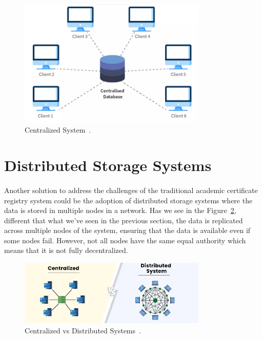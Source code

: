 \begin{figure}[h]\label{fig:centralized-system}
    \begin{center}
        \includegraphics[width=0.8\textwidth]{assets/centralized-database.png}
        \caption{Centralized System~\cite{centralizedDB}.}
    \end{center}
\end{figure}

\section{Distributed Storage Systems}\label{sec:distributed-systems}
\paragraph{}

Another solution to address the challenges of the traditional academic certificate registry system could be the adoption of distributed storage systems where the data is stored in multiple nodes in a network.
Has we see in the Figure~\ref{fig:distributed-system}, different that what we've seen in the previous section, the data is replicated across multiple nodes of the system, ensuring that the data is available even if some nodes fail. However, not all nodes have the same equal authority which means that
it is not fully decentralized.

\vspace{.25cm}
\begin{figure}[h]\label{fig:distributed-system}
    \begin{center}
        \includegraphics[width=0.8\textwidth]{assets/centralized-vs-distributed.png}
        \caption{Centralized vs Distributed Systems~\cite{centralizedVsDistributed}.}
    \end{center}
\end{figure}

